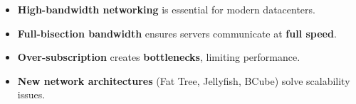 \highspace
\begin{takeawaysbox}
    \begin{itemize}
        \item \textbf{High-bandwidth networking} is essential for modern datacenters.
        \item \textbf{Full-bisection bandwidth} ensures servers communicate at \textbf{full speed}.
        \item \textbf{Over-subscription} creates \textbf{bottlenecks}, limiting performance.
        \item \textbf{New network architectures} (Fat Tree, Jellyfish, BCube) solve scalability issues.
    \end{itemize}
\end{takeawaysbox}
